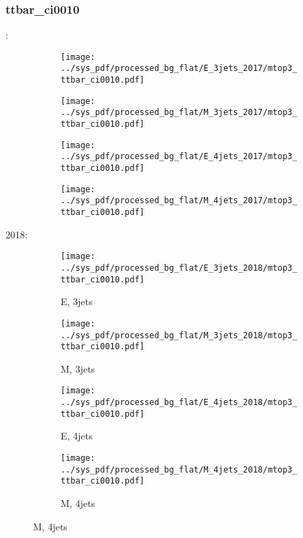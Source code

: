 \documentclass{beamer}
\begin{document}
\begin{frame}
\frametitle{ttbar_ci0010}
\fontsize{5}{1}:
\begin{figure}
\centering
\begin{subfigure}[b]{0.24\textwidth}
\texttt{[image: ../sys\_pdf/processed\_bg\_flat/E\_3jets\_2017/mtop3\_ttbar\_ci0010.pdf]}
\end{subfigure}
\begin{subfigure}[b]{0.24\textwidth}
\texttt{[image: ../sys\_pdf/processed\_bg\_flat/M\_3jets\_2017/mtop3\_ttbar\_ci0010.pdf]}
\end{subfigure}
\begin{subfigure}[b]{0.24\textwidth}
\texttt{[image: ../sys\_pdf/processed\_bg\_flat/E\_4jets\_2017/mtop3\_ttbar\_ci0010.pdf]}
\end{subfigure}
\begin{subfigure}[b]{0.24\textwidth}
\texttt{[image: ../sys\_pdf/processed\_bg\_flat/M\_4jets\_2017/mtop3\_ttbar\_ci0010.pdf]}
\end{subfigure}
\end{figure}
2018:
\begin{figure}
\centering
\begin{subfigure}[b]{0.24\textwidth}
\texttt{[image: ../sys\_pdf/processed\_bg\_flat/E\_3jets\_2018/mtop3\_ttbar\_ci0010.pdf]}
\captionsetup{font=tiny}
\caption{E, 3jets}
\end{subfigure}
\begin{subfigure}[b]{0.24\textwidth}
\texttt{[image: ../sys\_pdf/processed\_bg\_flat/M\_3jets\_2018/mtop3\_ttbar\_ci0010.pdf]}
\captionsetup{font=tiny}
\caption{M, 3jets}
\end{subfigure}
\begin{subfigure}[b]{0.24\textwidth}
\texttt{[image: ../sys\_pdf/processed\_bg\_flat/E\_4jets\_2018/mtop3\_ttbar\_ci0010.pdf]}
\captionsetup{font=tiny}
\caption{E, 4jets}
\end{subfigure}
\begin{subfigure}[b]{0.24\textwidth}
\texttt{[image: ../sys\_pdf/processed\_bg\_flat/M\_4jets\_2018/mtop3\_ttbar\_ci0010.pdf]}
\captionsetup{font=tiny}
\caption{M, 4jets}
\end{subfigure}
\end{figure}
\end{frame}
\end{document}
